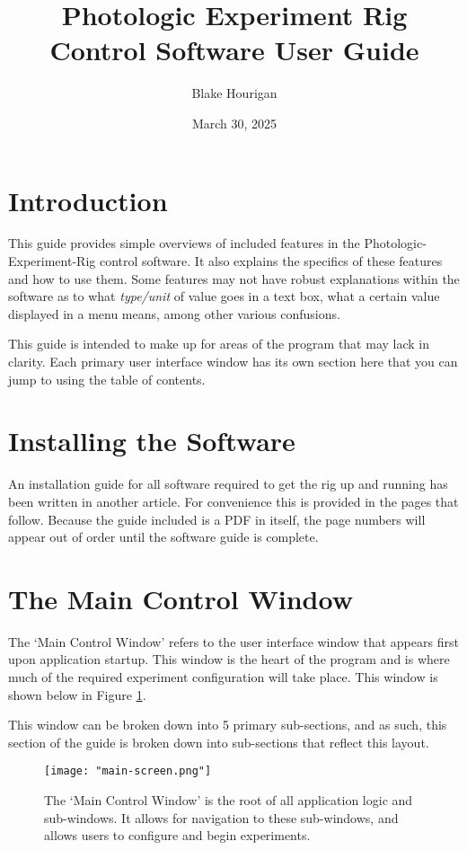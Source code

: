 \documentclass{article}
\title{\textbf{Photologic Experiment Rig}\\Control Software User Guide}
\author{Blake Hourigan}
\date{March 30, 2025}
\begin{document}
\maketitle
\clearpage
\tableofcontents
\clearpage


\section{Introduction}
This guide provides simple overviews of included features in the Photologic-Experiment-Rig control software. It also explains the specifics of these features and how to use 
them. Some features may not have robust explanations within the software as to what \textit{type/unit} of value goes in a text box, 
what a certain value displayed in a menu means, among other various confusions. 

This guide is intended to make up for areas of the program that may lack in clarity. Each primary user interface window has its own section here that you can jump
to using the table of contents. 

\section{Installing the Software}
\label{sec:installation}
An installation guide for all software required to get the rig up and running has been written in another article. For convenience this is provided in the pages that follow.
Because the guide included is a PDF in itself, the page numbers will appear out of order until the software guide is complete.
 

\section{The Main Control Window}
\label{sec:main-control}
The `Main Control Window' refers to the user interface window that appears first upon application startup. This window is the heart of the program and is where much of the 
required experiment configuration will take place. This window is shown below in Figure \ref{fig:main-screen}. 

This window can be broken down into 5 primary sub-sections, and as such, this section of the guide is broken down into sub-sections that reflect this layout. 

\begin{figure}[h!]
        \centering
        \texttt{[image: "main-screen.png"]}
        \caption{The `Main Control Window' is the root of all application logic and sub-windows. It allows for navigation to these sub-windows, 
        and allows users to configure and begin experiments.}
        \label{fig:main-screen}
\end{figure}
\FloatBarrier
\end{document}
